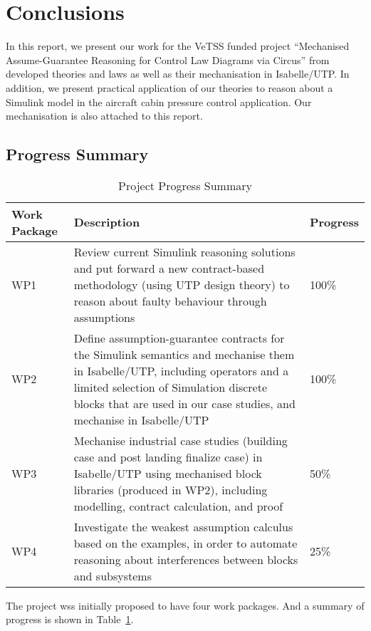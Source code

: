 \section{Conclusions}
\label{sec:conclu}

In this report, we present our work for the VeTSS funded project ``Mechanised Assume-Guarantee Reasoning for Control Law Diagrams via Circus'' from developed theories and laws as well as their mechanisation in Isabelle/UTP. In addition, we present practical application of our theories to reason about a Simulink model in the aircraft cabin pressure control application. Our mechanisation is also attached to this report.  

\subsection{Progress Summary}
\begin{table}
    \centering
    \begin{tabular}{|l|p{10cm}|l|}
       \hline
       Work Package & Description & Progress \\
       \hline
       WP1 & Review current Simulink reasoning solutions and put forward a new contract-based methodology (using UTP design theory) to reason about faulty behaviour through assumptions & 100\% \\
       \hline
       WP2 & Define assumption-guarantee contracts for the Simulink semantics and mechanise them in Isabelle/UTP, including operators and a limited selection of Simulation discrete blocks that are used in our case studies, and mechanise in Isabelle/UTP & 100\%  \\
       \hline
       WP3 & Mechanise industrial case studies (building case and post landing finalize case) in Isabelle/UTP using mechanised block libraries (produced in WP2), including modelling, contract calculation, and proof & 50\% \\
       \hline
       WP4 & Investigate the weakest assumption calculus based on the examples, in order to automate reasoning about interferences between blocks and subsystems & 25\% \\
       \hline
    \end{tabular}
    \caption{Project Progress Summary}
    \label{tab:progress}
\end{table}

The project wss initially proposed to have four work packages. And a summary of progress is shown in Table~\ref{tab:progress}. 

